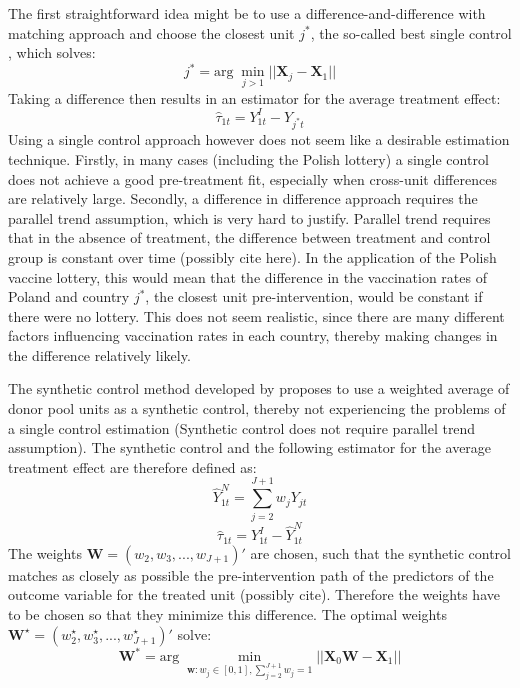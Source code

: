 \documentclass{scrbook}
\begin{document}
The first straightforward idea might be to use a
difference-and-difference with matching approach and choose the closest
unit \(j^{*}\), the so-called best single control
\parencite{doudchenko_balancing_2016}, which solves: \begin{equation}
j^{*}=\text{arg}\; \min_{j>1}\vert\vert\mathbf{X}_{j}-\mathbf{X}_{1}\vert\vert
\end{equation} Taking a difference then results in an estimator for the
average treatment effect: \begin{equation}
\hat{\tau}_{1t}=Y_{1t}^{I}-Y_{j^{*}t}
\end{equation} Using a single control approach however does not seem
like a desirable estimation technique. Firstly, in many cases (including
the Polish lottery) a single control does not achieve a good
pre-treatment fit, especially when cross-unit differences are relatively
large. Secondly, a difference in difference approach requires the
parallel trend assumption, which is very hard to justify. Parallel trend
requires that in the absence of treatment, the difference between
treatment and control group is constant over time (possibly cite here).
In the application of the Polish vaccine lottery, this would mean that
the difference in the vaccination rates of Poland and country \(j^{*}\),
the closest unit pre-intervention, would be constant if there were no
lottery. This does not seem realistic, since there are many different
factors influencing vaccination rates in each country, thereby making
changes in the difference relatively likely.

The synthetic control method developed by
\textcite{abadie_economic_2003} proposes to use a weighted average of
donor pool units as a synthetic control, thereby not experiencing the
problems of a single control estimation (Synthetic control does not
require parallel trend assumption). The synthetic control and the
following estimator for the average treatment effect are therefore
defined as: \begin{equation}
\hat{Y}_{1t}^{N}=\sum_{j=2}^{J+1} w_{j}Y_{jt}
\end{equation} \begin{equation}
\hat{\tau}_{1t}=Y_{1t}^{I}-\hat{Y}_{1t}^{N}
\end{equation} The weights \(\mathbf{W}=(w_{2},w_{3},...,w_{J+1})'\) are
chosen, such that the synthetic control matches as closely as possible
the pre-intervention path of the predictors of the outcome variable for
the treated unit (possibly cite). Therefore the weights have to be
chosen so that they minimize this difference. The optimal weights
\(\mathbf{W}^{\star}=(w_{2}^{\star},w_{3}^{\star},...,w_{J+1}^{\star})'\)
solve: \begin{equation}
\mathbf{W}^{*}=\text{arg}\; \min_{\mathbf{w}:w_{j}\in[0,1],\sum_{j=2}^{J+1} w_{j}=1}\vert\vert\mathbf{X}_{0}\mathbf{W}-\mathbf{X}_{1}\vert\vert
\end{equation}
\end{document}
